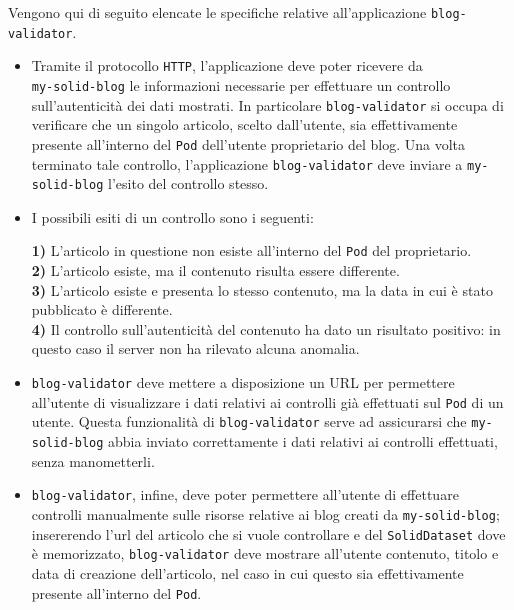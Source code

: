 \bigskip

Vengono qui di seguito elencate le specifiche relative all'applicazione {\tt blog-validator}.

\begin{itemize}
	\item Tramite il protocollo {\tt HTTP}, l'applicazione deve poter ricevere da\\{\tt my-solid-blog} le informazioni necessarie per effettuare un controllo sull'autenticità dei dati mostrati. In particolare {\tt blog-validator} si occupa di verificare che un singolo articolo, scelto dall'utente, sia effettivamente presente all'interno del {\tt Pod} dell'utente proprietario del blog. Una volta terminato tale controllo, l'applicazione {\tt blog-validator} deve inviare a {\tt my-solid-blog} l'esito del controllo stesso.
	\item I possibili esiti di un controllo sono i seguenti:
	
	\smallskip
	
	\textbf{1)} L'articolo in questione non esiste all'interno del {\tt Pod} del proprietario.\\
	\textbf{2)} L'articolo esiste, ma il contenuto risulta essere differente.\\
	\textbf{3)} L'articolo esiste e presenta lo stesso contenuto, ma la data in cui è stato pubblicato è differente.\\
	\textbf{4)} Il controllo sull'autenticità del contenuto ha dato un risultato positivo: in questo caso il server non ha rilevato alcuna anomalia.
	\item {\tt blog-validator} deve mettere a disposizione un URL per permettere all'utente di visualizzare i dati relativi ai controlli già effettuati sul {\tt Pod} di un utente. Questa funzionalità di {\tt blog-validator} serve ad assicurarsi che {\tt my-solid-blog} abbia inviato correttamente i dati relativi ai controlli effettuati, senza manometterli.
	\item {\tt blog-validator}, infine, deve poter permettere all'utente di effettuare controlli manualmente sulle risorse relative ai blog creati da {\tt my-solid-blog}; insererendo l'url del articolo che si vuole controllare e del {\tt SolidDataset} dove è memorizzato, {\tt blog-validator} deve mostrare all'utente contenuto, titolo e data di creazione dell'articolo, nel caso in cui questo sia effettivamente presente all'interno del {\tt Pod}.
\end{itemize}

\bigskip

